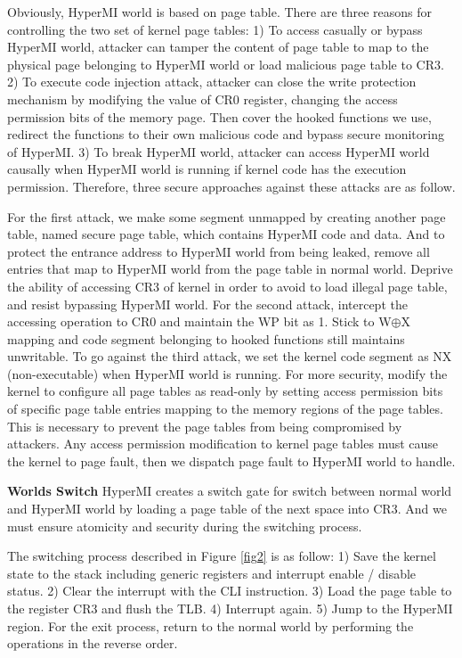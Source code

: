 \documentclass[conference]{IEEEtran}
\begin{document}
Obviously, HyperMI world is based on page table. There are three reasons for controlling the two set of kernel page tables: 1) To access casually or bypass HyperMI world, attacker can tamper the content of page table to map to the physical page belonging to HyperMI world or load malicious page table to CR3. 2) To execute code injection attack, attacker can close the write protection mechanism by modifying the value of CR0 register, changing the access permission bits of the memory page. Then cover the hooked functions we use, redirect the functions to their own malicious code and bypass secure monitoring of HyperMI. 3) To break HyperMI world, attacker can access HyperMI world causally when HyperMI world is running if kernel code has the execution permission. Therefore, three secure approaches against these attacks are as follow.

For the first attack, we make some segment unmapped by creating another page table, named secure page table, which contains HyperMI code and data. And to protect the entrance address to HyperMI world from being leaked,
remove all entries that map to HyperMI world from the page table in normal world. Deprive the ability of accessing CR3 of kernel in order to avoid to load illegal page table, and resist bypassing HyperMI world.
For the second attack, intercept the accessing operation to CR0 and maintain the WP bit as 1. Stick to W$\oplus${X} mapping and code segment belonging to hooked functions still maintains unwritable.
To go against the third attack, we set the kernel code segment as NX (non-executable) when HyperMI world is running. For more security, modify the kernel to configure all page tables as read-only by setting access permission bits of specific page table entries mapping to the memory regions of the page tables. This is necessary to prevent the page tables from being compromised by attackers. Any access permission modification to kernel page tables must cause the kernel to page fault, then we dispatch page fault to HyperMI world to handle.

\textbf{Worlds Switch}
HyperMI creates a switch gate for switch between normal world and HyperMI world by loading a page table of the next space into CR3. And we must ensure atomicity and security during the switching process.

The switching process described in Figure \ref{fig2} is as follow: 1) Save the kernel state to the stack including generic registers and interrupt enable / disable status. 2) Clear the interrupt with the CLI instruction. 3) Load the page table to the register CR3 and flush the TLB. 4) Interrupt again. 5) Jump to the HyperMI region. For the exit process, return to the normal world by performing the operations in the reverse order.
\end{document}

